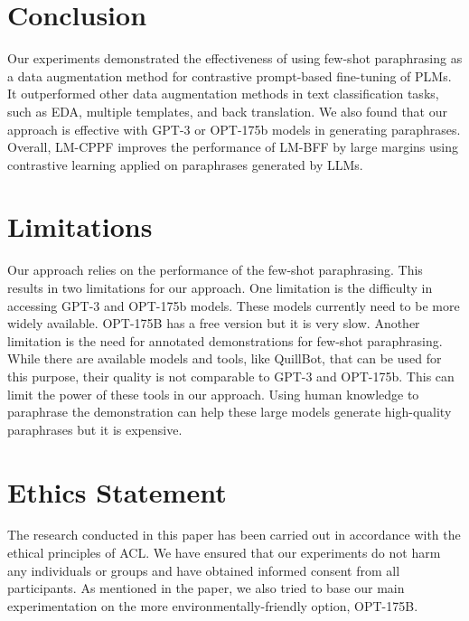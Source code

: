 \documentclass[11pt]{article}
\begin{document}
\section{Conclusion}
\label{sec:conclusion}

Our experiments demonstrated the effectiveness of using few-shot paraphrasing as a data augmentation method for contrastive prompt-based fine-tuning of PLMs. It outperformed other data augmentation methods in text classification tasks, such as EDA, multiple templates, and back translation. We also found that our approach is effective with GPT-3 or OPT-175b models in generating paraphrases. Overall, LM-CPPF improves the performance of LM-BFF by large margins using contrastive learning applied on paraphrases generated by LLMs.

\section*{Limitations}
Our approach relies on the performance of the few-shot paraphrasing. This results in two limitations for our approach. One limitation is the difficulty in accessing GPT-3 and OPT-175b models. These models currently need to be more widely available. OPT-175B has a free version but it is very slow. Another limitation is the need for annotated demonstrations for few-shot paraphrasing. While there are available models and tools, like QuillBot, that can be used for this purpose,  their quality is not comparable to GPT-3 and OPT-175b. This can limit the power of these tools in our approach. Using human knowledge to paraphrase the demonstration can help these large models generate high-quality paraphrases but it is expensive. 

\section*{Ethics Statement}
The research conducted in this paper has been carried out in accordance with the ethical principles of ACL. We have ensured that our experiments do not harm any individuals or groups and have obtained informed consent from all participants. As mentioned in the paper, we also tried to base our main experimentation on the more environmentally-friendly option,  OPT-175B. 




\appendix

\renewcommand{\thetable}{\Alph{section}.\arabic{table}}
\setcounter{table}{0}
\end{document}
